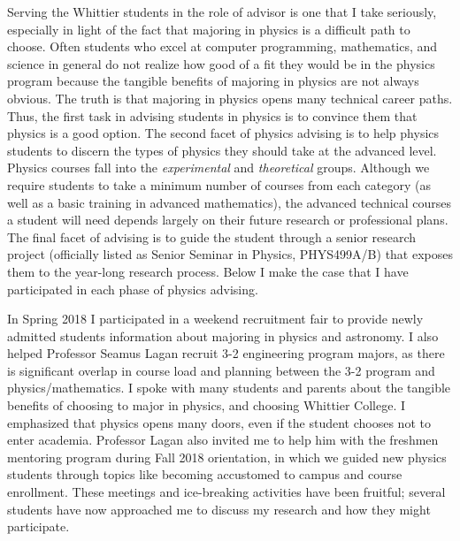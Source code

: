 \documentclass[../main.tex]{subfiles}
\begin{document}
Serving the Whittier students in the role of advisor is one that I take seriously, especially in light of the fact that majoring in physics is a difficult path to choose.  Often students who excel at computer programming, mathematics, and science in general do not realize how good of a fit they would be in the physics program because the tangible benefits of majoring in physics are not always obvious.  The truth is that majoring in physics opens many technical career paths.  Thus, the first task in advising students in physics is to convince them that physics is a good option.  The second facet of physics advising is to help physics students to discern the types of physics they should take at the advanced level.  Physics courses fall into the \textit{experimental} and \textit{theoretical} groups.  Although we require students to take a minimum number of courses from each category (as well as a basic training in advanced mathematics), the advanced technical courses a student will need depends largely on their future research or professional plans.  The final facet of advising is to guide the student through a senior research project (officially listed as Senior Seminar in Physics, PHYS499A/B) that exposes them to the year-long research process.  Below I make the case that I have participated in each phase of physics advising. \\ \hspace{0.1cm}

In Spring 2018 I participated in a weekend recruitment fair to provide newly admitted students information about majoring in physics and astronomy.  I also helped Professor Seamus Lagan recruit 3-2 engineering program majors, as there is significant overlap in course load and planning between the 3-2 program and physics/mathematics.  I spoke with many students and parents about the tangible benefits of choosing to major in physics, and choosing Whittier College.  I emphasized that physics opens many doors, even if the student chooses not to enter academia.  Professor Lagan also invited me to help him with the freshmen mentoring program during Fall 2018 orientation, in which we guided new physics students through topics like becoming accustomed to campus and course enrollment.  These meetings and ice-breaking activities have been fruitful; several students have now approached me to discuss my research and how they might participate. \\ \hspace{0.1cm}
\end{document}
